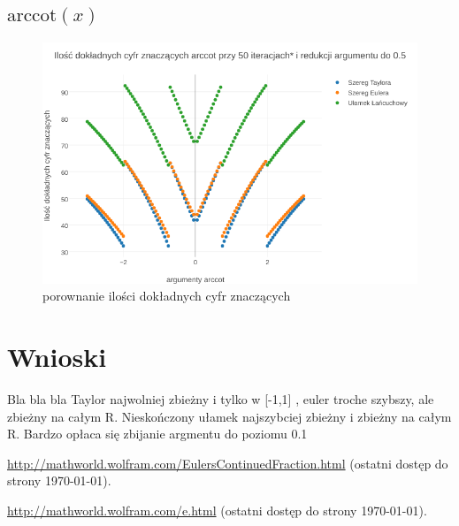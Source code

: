 \documentclass{article}
\begin{document}
\subsection{$\textrm{arccot}(x)$}
	\FloatBarrier
	\begin{figure}[]
		\includegraphics[width=\textwidth,scale=0.5]{acot_znaczace.png}
		\caption{porownanie ilości dokładnych cyfr znaczących}
		\label{wskaźnik uwarunkowania}
	\end{figure}
	\FloatBarrier
	
\section{Wnioski}
Bla bla bla Taylor najwolniej zbieżny i tylko w [-1,1]
, euler troche szybszy, ale zbieżny na całym R.
Nieskończony ułamek najszybciej zbieżny i zbieżny na całym R.
Bardzo opłaca się zbijanie argmentu do poziomu 0.1


\begin{thebibliography}{9}
	\itemsep2pt
	 \url{http://mathworld.wolfram.com/EulersContinuedFraction.html}
	(ostatni dostęp do strony \today).
	
	 \url{http://mathworld.wolfram.com/e.html}
	(ostatni dostęp do strony \today).
	
\end{thebibliography}
\end{document}
